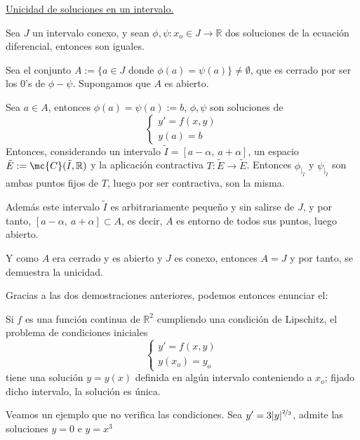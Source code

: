 \underline{Unicidad de soluciones en un intervalo.}
\begin{prop}
    Sea $J$ un intervalo conexo, y sean $\phi, \psi : x_o \in J \longrightarrow \mathbb R$ dos soluciones de la ecuación diferencial, entonces son iguales.
\end{prop}
\begin{dem}
    Sea el conjunto $A:=\{a \in J \text{ donde } \phi(a)=\psi(a)\} \neq \emptyset$, que es cerrado por ser los 0's de $\phi-\psi$. Supongamos que $A$ es abierto. 

    Sea $a \in A$, entonces $\phi(a)=\psi(a):=b$, $\phi, \psi$ son soluciones de 
    $$\left\{\begin{array}{l}
         y'=f(x,y)  \\
         y(a)=b
    \end{array} \right.$$
    Entonces, considerando un intervalo $\tilde{I}=[a-\alpha, \: a+\alpha]$, un espacio $\tilde{E}:=\mc{C}(\tilde{I}, \mathbb R)$ y la aplicación contractiva $T: \tilde{E} \longrightarrow \tilde{E}$. Entonces $\phi_{|_{\tilde{I}}}$ y $\psi_{|_{\tilde{I}}}$ son ambas puntos fijos de $T$, luego por ser contractiva, son la misma.
    
    Además este intervalo $\tilde{I}$ es arbitrariamente pequeño y sin salirse de $J$, y por tanto, $[a-\alpha, \: a+\alpha] \subset A$, es decir, $A$ es entorno de todos sus puntos, luego abierto.

    Y como $A$ era cerrado y es abierto y $J$ es conexo, entonces $A=J$ y por tanto, se demuestra la unicidad.
\end{dem}
Gracias a las dos demostraciones anteriores, podemos entonces enunciar el:
\begin{teo} Si $f$ es una función continua de $\mathbb R^2$ cumpliendo
una condición de Lipschitz, el problema de condiciones iniciales 
$$\left\{\begin{array}{l}
     y'=f(x,y)  \\
     y(x_o)=y_o
\end{array} \right.$$
tiene una solución $y = y(x)$ definida en algún intervalo conteniendo a $x_o$; fijado dicho
intervalo, la solución es única. 
\end{teo}
\begin{obs}
    Veamos un ejemplo que no verifica las condiciones. Sea $y'=3|y|^{\nicefrac{2}{3}}$, admite las soluciones $y=0$ e $y=x^3$
\end{obs}
